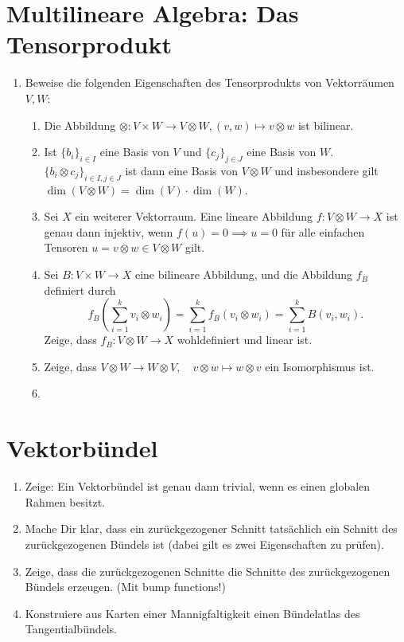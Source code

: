 \documentclass[a4paper]{scrartcl}
\begin{document}
	\section{Multilineare Algebra: Das Tensorprodukt}
	\begin{enumerate}
		\item Beweise die folgenden Eigenschaften des Tensorprodukts von Vektorräumen $V,W$:
			\begin{enumerate}[label=(\alph*)]
		\item Die Abbildung $\otimes\colon V\times W\to V\otimes W, (v,w) \mapsto v\otimes w$ ist bilinear.
		\item Ist $\{b_i\}_{i\in I}$ eine Basis von $V$ und $\{c_j\}_{j\in J}$ eine Basis von $W$. $\{b_i \otimes c_j\}_{i\in I, j\in J}$ ist dann eine Basis von $V\otimes W$ und insbesondere gilt $\dim(V\otimes W) = \dim(V) \cdot \dim(W)$.
		\item Sei $X$ ein weiterer Vektorraum. Eine lineare Abbildung $f\colon V\otimes W \to X$ ist genau dann injektiv, wenn $f(u) = 0 \implies u = 0$ für alle einfachen Tensoren $u = v\otimes w \in V\otimes W$ gilt.
		\item Sei $B\colon V\times W \to X$ eine bilineare Abbildung, und die Abbildung $f_B$ definiert durch 
		\[f_B\left(\sum_{i=1}^k v_i \otimes w_i\right) = \sum_{i=1}^k f_B(v_i \otimes w_i) = \sum_{i=1}^k B(v_i,w_i).\]
			Zeige, dass $f_B\colon V\otimes W\rightarrow X$ wohldefiniert und linear ist.
		\item Zeige, dass $V\otimes W\rightarrow W\otimes V,\quad v\otimes w \mapsto w\otimes v$ ein Isomorphismus ist.
		\item 
		\end{enumerate}
	\end{enumerate}
	\section{Vektorbündel}
	\begin{enumerate}
		\item Zeige: Ein Vektorbündel ist genau dann trivial, wenn es einen globalen Rahmen besitzt.
		\item Mache Dir klar, dass ein zurückgezogener Schnitt tatsächlich ein Schnitt des zurückgezogenen Bündels ist (dabei gilt es zwei Eigenschaften zu prüfen).
		\item Zeige, dass die zurückgezogenen Schnitte die Schnitte des zurückgezogenen Bündels erzeugen. (Mit bump functions!)
		\item Konstruiere aus Karten einer Mannigfaltigkeit einen Bündelatlas des Tangentialbündels.
	\end{enumerate}
\end{document}
